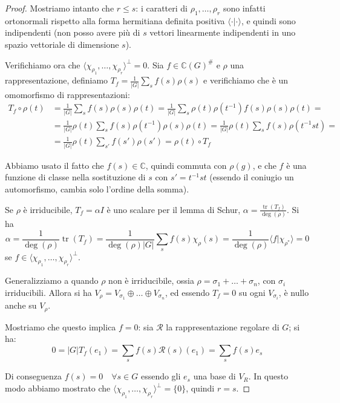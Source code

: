 \documentclass[11pt]{article}
\theoremstyle{plain}
\theoremstyle{definition}
\theoremstyle{remark}
\newcommand{\C}{\mathbb{C}}
\newcommand{\dsum}{\displaystyle\sum}
\DeclareMathOperator{\tr}{tr}
\begin{document}
\begin{proof}
 
Mostriamo intanto che $r \leq s$: i caratteri di $\rho_1, \ldots , \rho_r$ sono infatti ortonormali rispetto alla forma hermitiana
definita positiva $\langle \cdot | \cdot \rangle$, e quindi sono indipendenti (non posso avere più di $s$ vettori linearmente indipendenti 
in uno spazio vettoriale di dimensione $s$).

Verifichiamo ora che $\langle \chi_{\rho_1}, \ldots, \chi_{\rho_r} \rangle ^{\perp} = {0}$. Sia $f \in \C(G)^\#$ e $\rho$ una rappresentazione,
definiamo $T_f= \frac{1}{|G|}\dsum_s f(s)\rho(s)$ e verifichiamo che è un omomorfismo di rappresentazioni: 
\begin{align*}
 T_f \circ \rho(t) &= \frac{1}{|G|}\dsum_s f(s)\rho(s) \rho(t) = \frac{1}{|G|}\dsum_s \rho(t) \rho(t^{-1}) f(s)\rho(s) \rho(t) = \\
 &= \frac{1}{|G|}\rho(t) \dsum_s f(s) \rho(t^{-1}) \rho(s) \rho(t) = \frac{1}{|G|}\rho(t) \dsum_s f(s) \rho(t^{-1}st) =  \\
 &= \frac{1}{|G|}\rho(t) \dsum_{s'} f(s') \rho(s')= \rho(t) \circ T_f 
\end{align*}

Abbiamo usato il fatto che $f(s)\in \C$, quindi commuta con $\rho(g)$, e che $f$ è una funzione di classe nella 
sostituzione di $s$ con $s'= t^{-1}st$ (essendo il coniugio un automorfismo, cambia solo l'ordine della somma).

Se $\rho$ è irriducibile, $T_f= \alpha I$ è uno scalare per il lemma di Schur, $\alpha= \frac{\tr(T_f)}{\deg(\rho)}$.
Si ha $$\alpha =\frac{1}{\deg(\rho)}\tr(T_f)=\frac{1}{\deg(\rho)|G|}\dsum_s f(s) \chi_\rho(s)=
\frac{1}{\deg(\rho)} \langle f | \chi_{\rho^*} \rangle = 0$$ se $f \in \langle \chi_{\rho_1}, \ldots, \chi_{\rho_r} \rangle ^{\perp}$.

Generalizziamo a quando $\rho$ non è irriducibile, ossia $\rho = \sigma_1+ \ldots + \sigma_n$, con $\sigma_i$ irriducibili. Allora 
si ha $V_\rho = V_{\sigma_1}  \oplus \ldots \oplus V_{\sigma_n}$, ed essendo $T_f=0 $ su ogni $V_{\sigma_i}$, è nullo anche su $V_\rho$.

Mostriamo che questo implica $f=0$: sia $\mathcal{R}$ la rappresentazione regolare di $G$; si ha:
$$ 0= |G| T_f (e_1) = \dsum_s f(s) \mathcal{R}(s)(e_1) = \dsum_s f(s) e_s $$

Di conseguenza $f(s)=0 \quad \forall s \in G$ essendo gli $e_s$ una base di $V_R$.
In questo modo abbiamo mostrato che $\langle \chi_{\rho_1}, \ldots, \chi_{\rho_r} \rangle ^{\perp} = \{0\}$, quindi $r=s$.
\end{proof}
\end{document}
